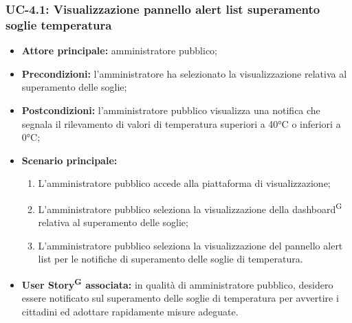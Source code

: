 \documentclass[8pt]{article}
\newcommand{\glossterm}[1]{#1\textsuperscript{G}} %
\begin{document}
\subsubsection*{UC-4.1: Visualizzazione pannello alert list superamento soglie temperatura}
\begin{itemize}
    \item \textbf{Attore principale:} amministratore pubblico;
    \item \textbf{Precondizioni:} l'amministratore ha selezionato la visualizzazione relativa al superamento delle soglie;
    \item \textbf{Postcondizioni:} l’amministratore pubblico visualizza una notifica che segnala il rilevamento di valori di temperatura superiori a 40°C o inferiori a 0°C;
    \item \textbf{Scenario principale:}
        \begin{enumerate}
        \item L’amministratore pubblico accede alla piattaforma di visualizzazione;
        \item L’amministratore pubblico seleziona la visualizzazione della \glossterm{dashboard} relativa al superamento delle soglie;
        \item L'amministratore pubblico seleziona la visualizzazione del pannello alert list per le notifiche di superamento delle soglie di temperatura.
        \end{enumerate}
    \item \textbf{\glossterm{User Story} associata:} in qualità di amministratore pubblico, desidero essere notificato sul superamento delle soglie di temperatura per avvertire i cittadini ed adottare rapidamente misure adeguate.
\end{itemize}
\end{document}
